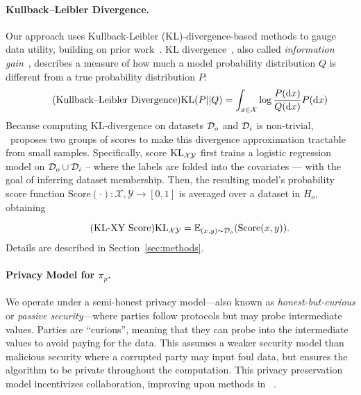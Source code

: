 \paragraph{Kullback–Leibler Divergence.} Our approach uses Kullback-Leibler (KL)-divergence-based methods to gauge data utility, building on prior work~\cite{shen2024data}. KL divergence~\cite{kullback1951information}, also called \emph{information gain}~\cite{quinlan1986induction}, describes a measure of how much a model probability distribution $Q$ is different from a true probability distribution $P$:
\begin{equation}
\tag{Kullback–Leibler Divergence}
\mathrm{KL}(P||Q) = \int_{x\in \mathcal{X}} \log\frac{P(\mathop{}\!\mathrm{d} x)}{Q(\mathop{}\!\mathrm{d} x)}P(\mathop{}\!\mathrm{d} x)
\end{equation}
Because computing KL-divergence on datasets $\mathcal{D}_o$ and $\mathcal{D}_i$ is non-trivial, ~\priorp proposes two groups of scores to make this divergence approximation tractable from small samples.
 Specifically, score $\mathrm{KL}_{\mathcal{X}\mathcal{Y}}$ first trains a logistic regression model on $\mathcal{D}_o \cup \mathcal{D}_i$ -- where the labels are folded into the covariates --- with the goal of inferring dataset membership. Then, the resulting model's probability score function $\text{Score}(\cdot): \mathcal{X, Y} \to [0,1]$ is averaged over a dataset in $H_o$, obtaining

\begin{equation}
\tag{KL-XY Score}
\mathrm{KL}_{\mathcal{X}\mathcal{Y}} = \mathbb{E}_{(x,y)\sim \mathcal{D}_o}(\text{Score}(x, y)).
\end{equation}
Details are described in Section~\ref{sec:methods}.
\paragraph{Privacy Model for $\pi_p$.} We operate under a semi-honest privacy model---also known as \emph{honest-but-curious} or \emph{passive security}---where parties follow protocols but may probe intermediate values. Parties are  ``curious'', meaning that they can probe into the intermediate values to avoid paying for the data. This assumes a weaker security model than malicious security where a corrupted party may input foul data, but ensures the algorithm to be private throughout the computation. This privacy preservation model incentivizes collaboration, improving upon methods in ~\priorp.



